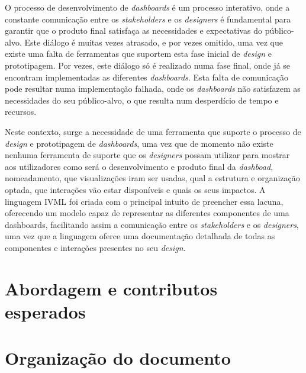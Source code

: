 O processo de desenvolvimento de \textit{dashboards} é um processo interativo, onde a constante comunicação entre os \textit{stakeholders} e os \textit{designers} é fundamental para garantir que o produto final satisfaça as necessidades e expectativas do público-alvo. Este diálogo é muitas vezes atrasado, e por vezes omitido, uma vez que existe uma falta de ferramentas que suportem esta fase inicial de \textit{design} e prototipagem. Por vezes, este diálogo só é realizado numa fase final, onde já se encontram implementadas as diferentes \textit{dashboards}. Esta falta de comunicação pode resultar numa implementação falhada, onde os \textit{dashboards} não satisfazem as necessidades do seu público-alvo, o que resulta num desperdício de tempo e recursos.

Neste contexto, surge a necessidade de uma ferramenta que suporte o processo de \textit{design} e prototipagem de \textit{dashboards}, uma vez que de momento não existe nenhuma ferramenta de suporte que os \textit{designers} possam utilizar para mostrar aos utilizadores como será o desenvolvimento e produto final da \textit{dashboad}, nomeadamento, que visualizações iram ser usadas, qual a estrutura e organização optada, que interações vão estar disponíveis e quais os seus impactos. A linguagem \gls{IVML} foi criada com o principal intuito de preencher essa lacuna, oferecendo um modelo capaz de representar as diferentes componentes de uma dashboards, facilitando assim a comunicação entre os \textit{stakeholders} e os \textit{designers}, uma vez que a linguagem oferce uma documentação detalhada de todas as componentes e interações presentes no seu \textit{design}.

\section{Abordagem e contributos esperados}
\label{sec:contribuicoes}

\section{Organização do documento}
\label{sec:organizacao}

